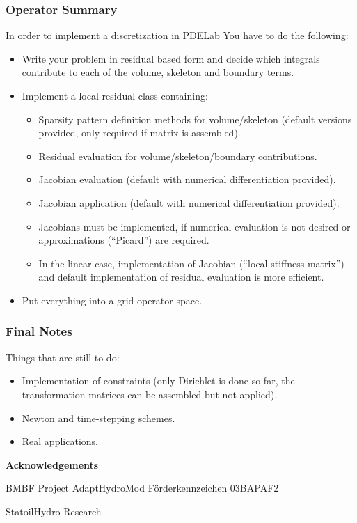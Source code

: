 \begin{frame}
\frametitle<presentation>{Operator Summary}
In order to implement a discretization in PDELab You have to do the
following:
\begin{itemize}
\item Write your problem in residual based form and decide which
integrals contribute to each of the volume, skeleton and boundary
terms.
\item Implement a local residual class containing:
\begin{itemize}
\item Sparsity pattern definition methods for volume/skeleton (default
versions provided, only required if matrix is assembled).
\item Residual evaluation for volume/skeleton/boundary contributions.
\item Jacobian evaluation (default with numerical differentiation
provided).
\item Jacobian application (default with numerical differentiation
provided).
\item Jacobians must be implemented, if numerical evaluation is not
desired or approximations (``Picard'') are required.
\item In the linear case, implementation of Jacobian (``local stiffness
matrix'') and default implementation of residual evaluation is more
efficient. 
\end{itemize}
\item Put everything into a grid operator space.
\end{itemize}
\end{frame}

\begin{frame}
\frametitle<presentation>{Final Notes}
Things that are still to do:
\begin{itemize}
\item Implementation of constraints (only Dirichlet is done so far,
the transformation matrices can be assembled but not applied). 
\item Newton and time-stepping schemes.
\item Real applications.
\end{itemize}

\medskip
\begin{center}
\textbf{Acknowledgements}

BMBF Project AdaptHydroMod Förderkennzeichen 03BAPAF2

StatoilHydro Research
\end{center}
\end{frame}

\cleardoublepage
